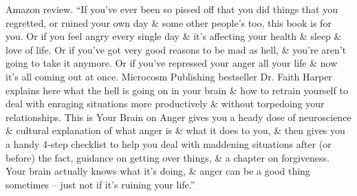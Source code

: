 \documentclass{article}
\begin{document}
\begin{enumerate}
	{\sf Amazon review.} ``If you've ever been so pissed off that you did things that you regretted, or ruined your own day \& some other people's too, this book is for you. Or if you feel angry every single day \& it's affecting your health \& sleep \& love of life. Or if you've got very good reasons to be mad as hell, \& you're aren't going to take it anymore. Or if you've repressed your anger all your life \& now it's all coming out at once. Microcosm Publishing bestseller Dr. {\sc Faith Harper} explains here what the hell is going on in your brain \& how to retrain yourself to deal with enraging situations more productively \& without torpedoing your relationships. This is Your Brain on Anger gives you a heady dose of neuroscience \& cultural explanation of what anger is \& what it does to you, \& then gives you a handy 4-step checklist to help you deal with maddening situations after (or before) the fact, guidance on getting over things, \& a chapter on forgiveness. Your brain actually knows what it's doing, \& anger can be a good thing sometimes -- just not if it's ruining your life.''
	

\end{enumerate}
\end{document}
